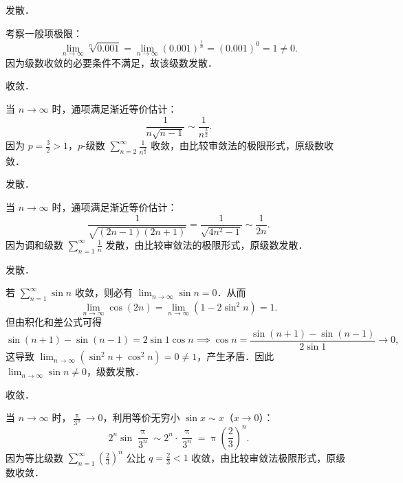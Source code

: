 \begin{solution}
     发散．

    考察一般项极限：
    \begin{equation}
        \lim_{n\to\infty} \sqrt[n]{0.001} = \lim_{n\to\infty} (0.001)^{\frac{1}{n}} = (0.001)^0 = 1 \neq 0.
    \end{equation}
    因为级数收敛的必要条件不满足，故该级数发散．

     收敛．

    当 $n \to \infty$ 时，通项满足渐近等价估计：
    \begin{equation}
        \frac{1}{n\sqrt{n-1}} \sim \frac{1}{n^{\frac{3}{2}}}.
    \end{equation}
    因为 $p = \frac{3}{2} > 1$，$p$-级数 $\sum_{n=2}^\infty \frac{1}{n^{\frac{3}{2}}}$ 收敛，由比较审敛法的极限形式，原级数收敛．

     发散．

    当 $n \to \infty$ 时，通项满足渐近等价估计：
    \begin{equation}
        \frac{1}{\sqrt{(2n-1)(2n+1)}} = \frac{1}{\sqrt{4n^2 - 1}} \sim \frac{1}{2n}.
    \end{equation}
    因为调和级数 $\sum_{n=1}^\infty \frac{1}{n}$ 发散，由比较审敛法的极限形式，原级数发散．

     发散．

    若 $\sum_{n=1}^\infty \sin n$ 收敛，则必有 $\lim_{n\to\infty} \sin n = 0$．从而
    \begin{equation}
        \lim_{n\to\infty} \cos(2n) = \lim_{n\to\infty} (1 - 2\sin^2 n) = 1.
    \end{equation}
    但由积化和差公式可得
    \begin{equation}
        \sin(n+1) - \sin(n-1) = 2\sin 1 \cos n \implies \cos n = \frac{\sin(n+1) - \sin(n-1)}{2\sin 1} \to 0,
    \end{equation}
    这导致 $\lim_{n\to\infty} (\sin^2 n + \cos^2 n) = 0 \neq 1$，产生矛盾．因此 $\lim_{n\to\infty} \sin n \neq 0$，级数发散．

     收敛．

    当 $n \to \infty$ 时，$\frac{\uppi}{3^n} \to 0$，利用等价无穷小 $\sin x \sim x$（$x \to 0$）：
    \begin{equation}
        2^n \sin \frac{\uppi}{3^n} \sim 2^n \cdot \frac{\uppi}{3^n} = \uppi \left(\frac{2}{3}\right)^n.
    \end{equation}
    因为等比级数 $\sum_{n=1}^\infty \left(\frac{2}{3}\right)^n$ 公比 $q = \frac{2}{3} < 1$ 收敛，由比较审敛法极限形式，原级数收敛．


\end{solution}
